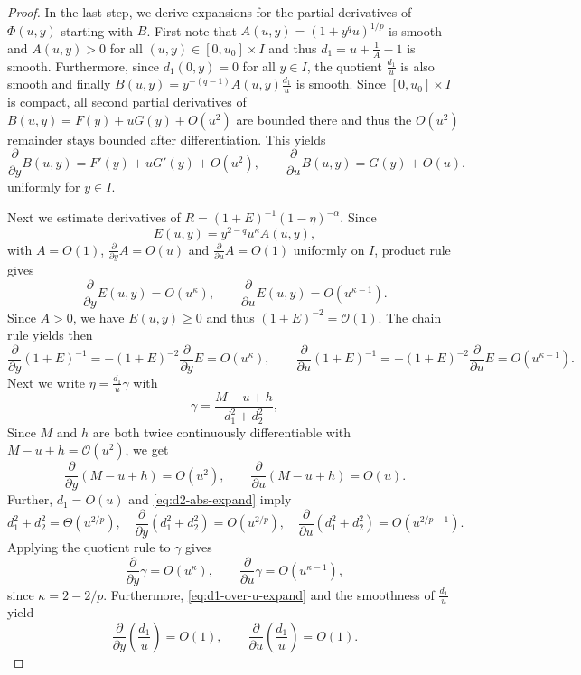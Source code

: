 \documentclass[10pt,a4paper]{amsart}
\begin{document}
\begin{proof}
    In the last step, we derive expansions for the partial derivatives of $\Phi(u,y)$ starting with $B$.
    First note that $A(u,y)=(1+y^q u)^{1/p}$ is smooth and $A(u,y) > 0$ for all $(u,y) \in [0,u_0]\times I$
    and thus $d_1 = u + \frac 1A - 1$ is smooth.
    Furthermore, since $d_1(0,y) = 0$ for all $y \in I$, the quotient $\frac{d_1}{u}$ is also smooth and finally $B(u,y)=y^{-(q-1)}A(u,y)\frac{d_1}{u}$ is smooth.
    Since $[0,u_0]\times I$ is compact, all second partial derivatives of $B(u,y)=F(y)+uG(y)+O(u^2)$ are bounded there
     and thus the $O(u^2)$ remainder stays bounded after differentiation.
    This yields
    \[
        \frac{\partial}{\partial y} B(u,y)=F'(y)+uG'(y)+O(u^2),\qquad
        \frac{\partial}{\partial u} B(u,y)=G(y)+O(u).
    \]
    uniformly for $y \in I$.

    Next we estimate derivatives of $R=(1+E)^{-1}(1-\eta)^{-\alpha}$.
    Since
    \[
        E(u,y)=y^{2-q}u^\kappa A(u,y),
    \]
    with $A=O(1)$, $\frac{\partial}{\partial y} A=O(u)$ and $\frac{\partial}{\partial u} A=O(1)$ uniformly on $I$, product
    rule gives
    \[
      \frac{\partial}{\partial y} E(u,y)=O(u^\kappa),\qquad
      \frac{\partial}{\partial u} E(u,y)=O(u^{\kappa-1}).
    \]
    Since $A >0$, we have $E(u,y) \geq 0$ and thus $(1+E)^{-2} = \mathcal{O}(1)$.
    The chain rule yields then
    \[
        \frac{\partial}{\partial y} (1+E)^{-1}=-(1+E)^{-2}\frac{\partial}{\partial y} E=O(u^\kappa),\qquad
        \frac{\partial}{\partial u} (1+E)^{-1}=-(1+E)^{-2}\frac{\partial}{\partial u} E=O(u^{\kappa-1}).
    \]
    Next we write $\eta=\frac{d_1}{u}\gamma$ with
    \[
        \gamma=\frac{M-u+h}{d_1^2+d_2^2},
    \]
    Since $M$ and $h$ are both twice continuously differentiable with $M - u + h  = \mathcal{O}(u^2)$, we get
    \[
        \frac{\partial}{\partial y} (M-u+h)=O(u^2),\qquad
        \frac{\partial}{\partial u} (M-u+h)=O(u).
    \]
    Further, $d_1=O(u)$ and \eqref{eq:d2-abs-expand} imply
    \[
        d_1^2+d_2^2=\Theta(u^{2/p}),\quad
        \frac{\partial}{\partial y}(d_1^2+d_2^2)=O(u^{2/p}),\quad
        \frac{\partial}{\partial u}(d_1^2+d_2^2)=O(u^{2/p-1}).
    \]
    Applying the quotient rule to $\gamma$ gives
    \[
        \frac{\partial}{\partial y} \gamma=O(u^\kappa),\qquad
        \frac{\partial}{\partial u} \gamma=O(u^{\kappa-1}),
    \]
    since $\kappa=2-2/p$.
    Furthermore, \eqref{eq:d1-over-u-expand} and the smoothness of $\frac{d_1}{u}$ yield
    \[
        \frac{\partial}{\partial y} \left(\frac{d_1}{u}\right)=O(1),\qquad
        \frac{\partial}{\partial u} \left(\frac{d_1}{u}\right)=O(1).
\]
\end{proof}
\end{document}
